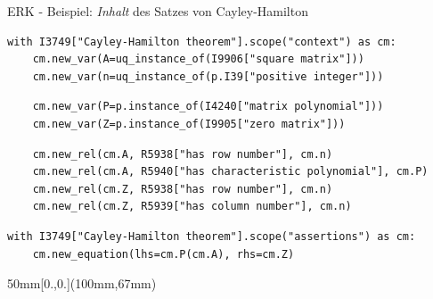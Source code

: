 \documentclass[
	ngerman,
	10pt,				%
	aspectratio=169 	%
]{beamer}
\begin{document}
\begin{frame}[t,fragile,label=erk5]{\large ERK - Beispiel: \textit{Inhalt} des Satzes von Cayley-Hamilton}

\vspace{-4mm}

\begin{lstlisting}
with I3749["Cayley-Hamilton theorem"].scope("context") as cm:
    cm.new_var(A=uq_instance_of(I9906["square matrix"]))
    cm.new_var(n=uq_instance_of(p.I39["positive integer"]))
\end{lstlisting}
\pause
\begin{lstlisting}
    cm.new_var(P=p.instance_of(I4240["matrix polynomial"]))
    cm.new_var(Z=p.instance_of(I9905["zero matrix"]))
\end{lstlisting}
\pause
\begin{lstlisting}
    cm.new_rel(cm.A, R5938["has row number"], cm.n)
    cm.new_rel(cm.A, R5940["has characteristic polynomial"], cm.P)
    cm.new_rel(cm.Z, R5938["has row number"], cm.n)
    cm.new_rel(cm.Z, R5939["has column number"], cm.n)
\end{lstlisting}
\pause
\begin{lstlisting}
with I3749["Cayley-Hamilton theorem"].scope("assertions") as cm:
    cm.new_equation(lhs=cm.P(cm.A), rhs=cm.Z)
\end{lstlisting}


\begin{textblock*}{50mm}[0.,0.](100mm,67mm)
\end{textblock*}

\end{frame}

  
\end{document}
